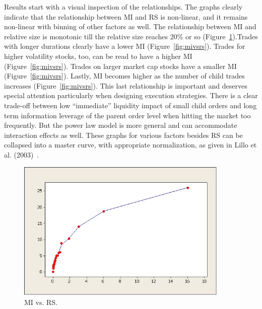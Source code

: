 Results start with a visual inspection of the relationships. The graphs clearly indicate that the relationship between MI and RS is non-linear, and it remains non-linear with binning of other factors as well. The relationship between MI and relative size is monotonic till the relative size reaches 20\% or so (Figure~\ref{fig:miandrsplot}).Trades with longer durations clearly have a lower MI (Figure~\ref{fig:mivsrs}). Trades for higher volatility stocks, too, can be read to have a higher MI (Figure~\ref{fig:mivsrs}). Trades on larger market cap stocks have a smaller MI (Figure~\ref{fig:mivsrs}). Lastly, MI becomes higher as the number of child trades increases (Figure~\ref{fig:mivsrs}). This last relationship is important and deserves special attention particularly when designing execution strategies. There is a clear trade-off between low ``immediate'' liquidity impact of small child orders and long term information leverage of the parent order level when hitting the market too frequently. But the power law model is more general and can accommodate interaction effects as well. These graphs for various factors besides RS can be collapsed into a master curve, with appropriate normalization, as given in Lillo et al. (2003)~\cite{farmermantegna}.
	
	\begin{figure}[!ht]
	\centering
	\includegraphics[width=0.9\textwidth]{chapters/chapter_exec_models/figures/fig3.jpg}
	\caption{MI vs. RS.\label{fig:miandrsplot}}
	\end{figure}

